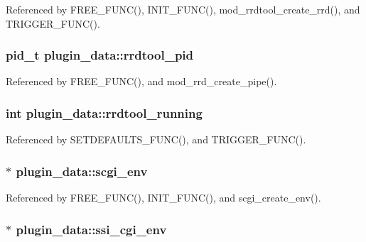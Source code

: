 Referenced by F\-R\-E\-E\-\_\-\-F\-U\-N\-C(), I\-N\-I\-T\-\_\-\-F\-U\-N\-C(), mod\-\_\-rrdtool\-\_\-create\-\_\-rrd(), and T\-R\-I\-G\-G\-E\-R\-\_\-\-F\-U\-N\-C().

\hypertarget{structplugin__data_a9a9b432f25aff950ab7d5c333c2a7755}{
\subsubsection[{rrdtool\-\_\-pid}]{\setlength{\rightskip}{0pt plus 5cm}pid\-\_\-t plugin\-\_\-data\-::rrdtool\-\_\-pid}}\label{structplugin__data_a9a9b432f25aff950ab7d5c333c2a7755}


Referenced by F\-R\-E\-E\-\_\-\-F\-U\-N\-C(), and mod\-\_\-rrd\-\_\-create\-\_\-pipe().

\hypertarget{structplugin__data_ad62a9fc9a0bb8459b14c6a4a45164097}{
\subsubsection[{rrdtool\-\_\-running}]{\setlength{\rightskip}{0pt plus 5cm}int plugin\-\_\-data\-::rrdtool\-\_\-running}}\label{structplugin__data_ad62a9fc9a0bb8459b14c6a4a45164097}


Referenced by S\-E\-T\-D\-E\-F\-A\-U\-L\-T\-S\-\_\-\-F\-U\-N\-C(), and T\-R\-I\-G\-G\-E\-R\-\_\-\-F\-U\-N\-C().

\hypertarget{structplugin__data_a86457136cbe403e62eb95d8708861fb3}{
\subsubsection[{scgi\-\_\-env}]{$\ast$ plugin\-\_\-data\-::scgi\-\_\-env}}\label{structplugin__data_a86457136cbe403e62eb95d8708861fb3}


Referenced by F\-R\-E\-E\-\_\-\-F\-U\-N\-C(), I\-N\-I\-T\-\_\-\-F\-U\-N\-C(), and scgi\-\_\-create\-\_\-env().

\hypertarget{structplugin__data_a958b1d61c27bad2cf2da5ebc1e9cd447}{
\subsubsection[{ssi\-\_\-cgi\-\_\-env}]{$\ast$ plugin\-\_\-data\-::ssi\-\_\-cgi\-\_\-env}}\label{structplugin__data_a958b1d61c27bad2cf2da5ebc1e9cd447}


